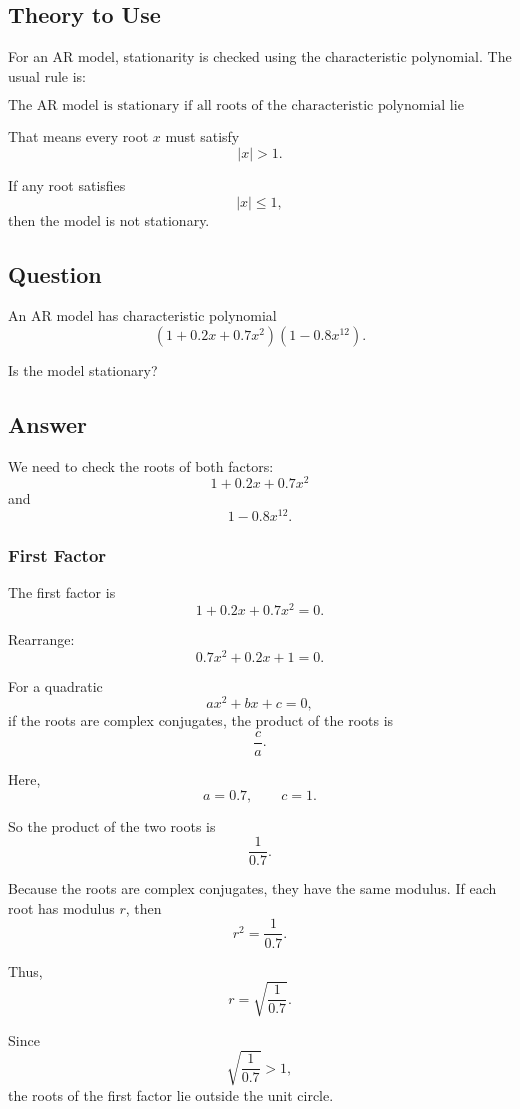 \documentclass[12pt]{article}
\begin{document}
\subsection*{Theory to Use}

For an AR model, stationarity is checked using the characteristic polynomial.
The usual rule is:

\[
\boxed{\text{The AR model is stationary if all roots of the characteristic polynomial lie outside the unit circle.}}
\]

That means every root \(x\) must satisfy
\[
|x|>1.
\]

If any root satisfies
\[
|x|\leq 1,
\]
then the model is not stationary.

\subsection*{Question}

An AR model has characteristic polynomial
\[
(1+0.2x+0.7x^2)(1-0.8x^{12}).
\]

Is the model stationary?

\subsection*{Answer}

We need to check the roots of both factors:
\[
1+0.2x+0.7x^2
\]
and
\[
1-0.8x^{12}.
\]

\subsubsection*{First Factor}

The first factor is
\[
1+0.2x+0.7x^2=0.
\]

Rearrange:
\[
0.7x^2+0.2x+1=0.
\]

For a quadratic
\[
ax^2+bx+c=0,
\]
if the roots are complex conjugates, the product of the roots is
\[
\frac{c}{a}.
\]

Here,
\[
a=0.7,\qquad c=1.
\]

So the product of the two roots is
\[
\frac{1}{0.7}.
\]

Because the roots are complex conjugates, they have the same modulus.  If each
root has modulus \(r\), then
\[
r^2=\frac{1}{0.7}.
\]

Thus,
\[
r=\sqrt{\frac{1}{0.7}}.
\]

Since
\[
\sqrt{\frac{1}{0.7}}>1,
\]
the roots of the first factor lie outside the unit circle.
\end{document}
